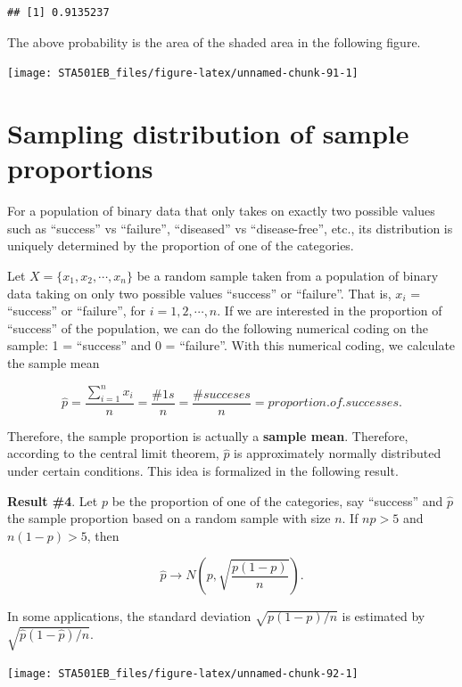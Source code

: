 \documentclass[
]{book}
\begin{document}
\begin{verbatim}
## [1] 0.9135237
\end{verbatim}

The above probability is the area of the shaded area in the following figure.

\begin{center}\texttt{[image: STA501EB\_files/figure-latex/unnamed-chunk-91-1]} \end{center}

\hypertarget{sampling-distribution-of-sample-proportions}{%
\section{Sampling distribution of sample proportions}\label{sampling-distribution-of-sample-proportions}}

For a population of binary data that only takes on exactly two possible values such as ``success'' vs ``failure'', ``diseased'' vs ``disease-free'', etc., its distribution is uniquely determined by the proportion of one of the categories.

Let \(X=\{x_1, x_2, \cdots, x_n\}\) be a random sample taken from a population of binary data taking on only two possible values ``success'' or ``failure''. That is, \(x_i\) = ``success'' or ``failure'', for \(i=1, 2, \cdots, n.\) If we are interested in the proportion of ``success'' of the population, we can do the following numerical coding on the sample:
1 = ``success'' and 0 = ``failure''. With this numerical coding, we calculate the sample mean

\[
\hat{p} = \frac{\sum_{i=1}^n x_i}{n} = \frac{\# 1s}{n} = \frac{\# succeses}{n} = proportion.of.successes.
\]

Therefore, the sample proportion is actually a \textbf{sample mean}. Therefore, according to the central limit theorem, \(\hat{p}\) is approximately normally distributed under certain conditions. This idea is formalized in the following result.

\textbf{Result \#4}. Let \(p\) be the proportion of one of the categories, say ``success'' and \(\hat{p}\) the sample proportion based on a random sample with size \(n\). If \(np > 5\) and \(n(1-p) > 5\), then

\[
\hat{p} \to N\left( p, \sqrt{\frac{p(1-p)}{n}}\right).
\]

In some applications, the standard deviation \(\sqrt{p(1-p)/n}\) is estimated by \(\sqrt{\hat{p}(1-\hat{p})/n}\).

\begin{center}\texttt{[image: STA501EB\_files/figure-latex/unnamed-chunk-92-1]} \end{center}
\end{document}
